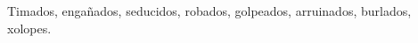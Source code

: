 \documentclass[12pt,twoside,openright,a5paper]{book}
\begin{document}
\vspace{0.5cm}

\hrulefill\hspace{0.2cm} \decofourleft\decofourright \hspace{0.2cm} \hrulefill
\vspace{0.5cm}

Timados, engañados, seducidos, robados, golpeados, arruinados, burlados, xolopes.

\vspace{0.5cm}


\vspace{0.5cm}
\hrulefill\hspace{0.2cm} \decofourleft\decofourright \hspace{0.2cm} \hrulefill
\end{document}
